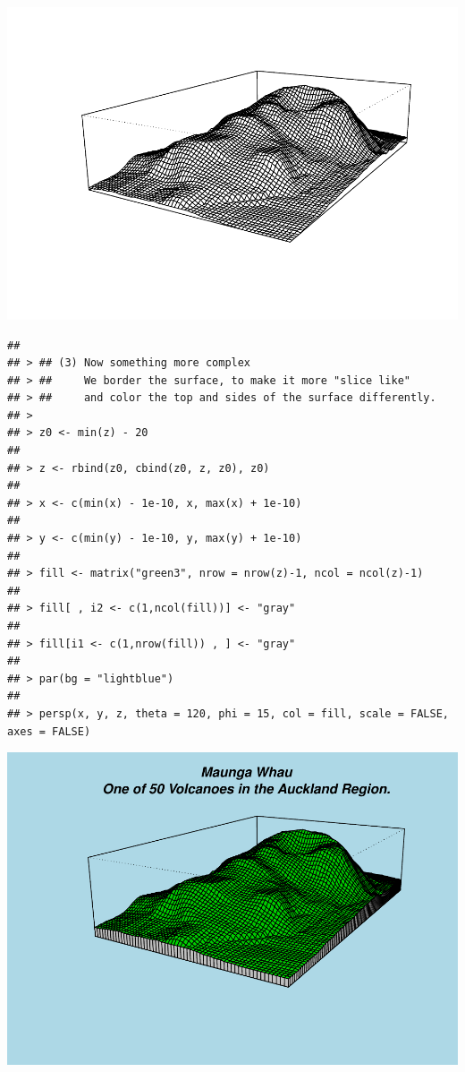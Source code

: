 \documentclass[
]{book}
\begin{document}
\includegraphics{TudodoR_files/figure-latex/unnamed-chunk-146-3.pdf}

\begin{verbatim}
## 
## > ## (3) Now something more complex
## > ##     We border the surface, to make it more "slice like"
## > ##     and color the top and sides of the surface differently.
## > 
## > z0 <- min(z) - 20
## 
## > z <- rbind(z0, cbind(z0, z, z0), z0)
## 
## > x <- c(min(x) - 1e-10, x, max(x) + 1e-10)
## 
## > y <- c(min(y) - 1e-10, y, max(y) + 1e-10)
## 
## > fill <- matrix("green3", nrow = nrow(z)-1, ncol = ncol(z)-1)
## 
## > fill[ , i2 <- c(1,ncol(fill))] <- "gray"
## 
## > fill[i1 <- c(1,nrow(fill)) , ] <- "gray"
## 
## > par(bg = "lightblue")
## 
## > persp(x, y, z, theta = 120, phi = 15, col = fill, scale = FALSE, axes = FALSE)
\end{verbatim}

\includegraphics{TudodoR_files/figure-latex/unnamed-chunk-146-4.pdf}
\end{document}
